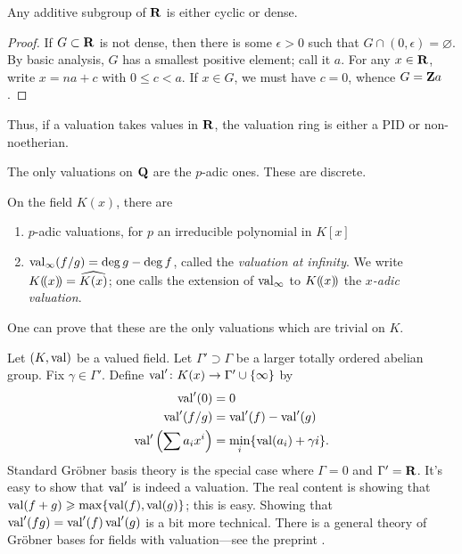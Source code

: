 \begin{lemma}
Any additive subgroup of $\mathbf{R}$ is either cyclic or dense. 
\end{lemma}
\begin{proof}
If $G\subset \mathbf{R}$ is not dense, then there is some $\epsilon>0$ such that 
$G\cap (0,\epsilon)=\varnothing$. By basic analysis, $G$ has a smallest 
positive element; call it $a$. For any $x\in \mathbf{R}$, write $x=n a+c$ with 
$0\leqslant c<a$. If $x\in G$, we must have $c=0$, whence $G=\mathbf{Z} a$. 
\end{proof}

Thus, if a valuation takes values in $\mathbf{R}$, the valuation ring is either 
a PID or non-noetherian. 

\begin{example}
The only valuations on $\mathbf{Q}$ are the $p$-adic ones. These are discrete. 
\end{example}

\begin{example}
On the field $K(x)$, there are 
\begin{enumerate}
\item
$p$-adic valuations, for $p$ an irreducible polynomial in $K[x]$

\item
$\operatorname{val}_\infty(f/g)=\deg g-\deg f$, called the \emph{valuation at 
infinity}. We write $K(\!( x)\!)=\widehat{K(x)}$; one calls the extension 
of $\operatorname{val}_\infty$ to $K(\!( x)\!)$ the \emph{$x$-adic valuation}. 
\end{enumerate}
One can prove that these are the only valuations which are trivial on $K$. 
\end{example}

Let $(K,\operatorname{val})$ be a valued field. Let $\Gamma'\supset\Gamma$ be a 
larger totally ordered abelian group. Fix $\gamma\in \Gamma'$. Define 
$\operatorname{val}'\colon K(x)\to \Gamma'\cup\{\infty\}$ by 
\begin{align*}
	\operatorname{val}'(0) &= 0 \\
	\operatorname{val}'(f/g) &= \operatorname{val}'(f)-\operatorname{val}'(g) \\
	\operatorname{val}'\left(\sum a_i x^i\right) &= \min_i \{\operatorname{val}(a_i)+\gamma i\} .
\end{align*}
Standard Gr\"obner basis theory is the special case where $\Gamma=0$ and 
$\Gamma'=\mathbf{R}$. It's easy to show that $\operatorname{val}'$ is indeed a valuation. 
The real content is showing that 
$\operatorname{val}(f+g)\geqslant \max\{\operatorname{val}(f),\operatorname{val}(g)\}$; this is easy. 
Showing that $\operatorname{val}'(fg)=\operatorname{val}'(f)\operatorname{val}'(g)$ is a bit more 
technical. There is a general theory of Gr\"obner bases for fields with 
valuation---see the preprint \cite{chan-maclagan}.

